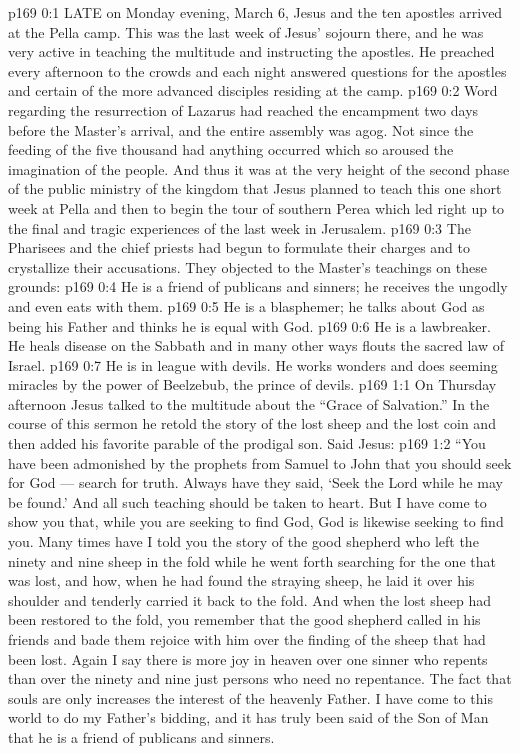 \vs p169 0:1 LATE on Monday evening, March 6, Jesus and the ten apostles arrived at the Pella camp. This was the last week of Jesus’ sojourn there, and he was very active in teaching the multitude and instructing the apostles. He preached every afternoon to the crowds and each night answered questions for the apostles and certain of the more advanced disciples residing at the camp.
\vs p169 0:2 Word regarding the resurrection of Lazarus had reached the encampment two days before the Master’s arrival, and the entire assembly was agog. Not since the feeding of the five thousand had anything occurred which so aroused the imagination of the people. And thus it was at the very height of the second phase of the public ministry of the kingdom that Jesus planned to teach this one short week at Pella and then to begin the tour of southern Perea which led right up to the final and tragic experiences of the last week in Jerusalem.
\vs p169 0:3 \pc The Pharisees and the chief priests had begun to formulate their charges and to crystallize their accusations. They objected to the Master’s teachings on these grounds:
\vs p169 0:4 \bibnobreakspace He is a friend of publicans and sinners; he receives the ungodly and even eats with them.
\vs p169 0:5 \bibnobreakspace He is a blasphemer; he talks about God as being his Father and thinks he is equal with God.
\vs p169 0:6 \bibnobreakspace He is a lawbreaker. He heals disease on the Sabbath and in many other ways flouts the sacred law of Israel.
\vs p169 0:7 \bibnobreakspace He is in league with devils. He works wonders and does seeming miracles by the power of Beelzebub, the prince of devils.
\vs p169 1:1 On Thursday afternoon Jesus talked to the multitude about the “Grace of Salvation.” In the course of this sermon he retold the story of the lost sheep and the lost coin and then added his favorite parable of the prodigal son. Said Jesus:
\vs p169 1:2 \pc \textcolor{ubdarkred}{“You have been admonished by the prophets from Samuel to John that you should seek for God --- search for truth. Always have they said, ‘Seek the Lord while he may be found.’ And all such teaching should be taken to heart. But I have come to show you that, while you are seeking to find God, God is likewise seeking to find you. Many times have I told you the story of the good shepherd who left the ninety and nine sheep in the fold while he went forth searching for the one that was lost, and how, when he had found the straying sheep, he laid it over his shoulder and tenderly carried it back to the fold. And when the lost sheep had been restored to the fold, you remember that the good shepherd called in his friends and bade them rejoice with him over the finding of the sheep that had been lost. Again I say there is more joy in heaven over one sinner who repents than over the ninety and nine just persons who need no repentance. The fact that souls are  only increases the interest of the heavenly Father. I have come to this world to do my Father’s bidding, and it has truly been said of the Son of Man that he is a friend of publicans and sinners.}
